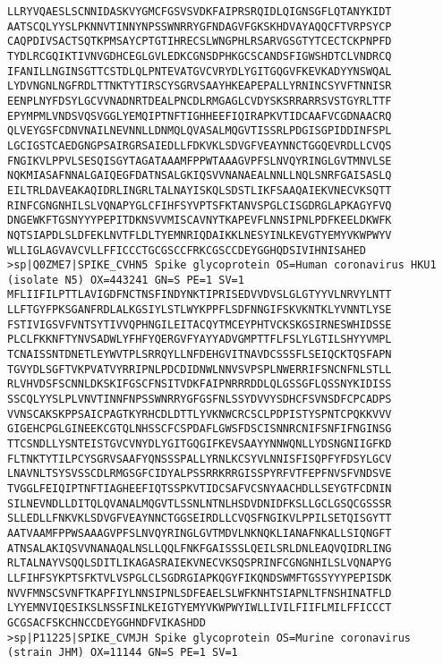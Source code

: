 \documentclass[en,black,12pt,normal]{elegantnote}
\begin{document}
\begin{lstlisting}
LLRYVQAESLSCNNIDASKVYGMCFGSVSVDKFAIPRSRQIDLQIGNSGFLQTANYKIDT
AATSCQLYYSLPKNNVTINNYNPSSWNRRYGFNDAGVFGKSKHDVAYAQQCFTVRPSYCP
CAQPDIVSACTSQTKPMSAYCPTGTIHRECSLWNGPHLRSARVGSGTYTCECTCKPNPFD
TYDLRCGQIKTIVNVGDHCEGLGVLEDKCGNSDPHKGCSCANDSFIGWSHDTCLVNDRCQ
IFANILLNGINSGTTCSTDLQLPNTEVATGVCVRYDLYGITGQGVFKEVKADYYNSWQAL
LYDVNGNLNGFRDLTTNKTYTIRSCYSGRVSAAYHKEAPEPALLYRNINCSYVFTNNISR
EENPLNYFDSYLGCVVNADNRTDEALPNCDLRMGAGLCVDYSKSRRARRSVSTGYRLTTF
EPYMPMLVNDSVQSVGGLYEMQIPTNFTIGHHEEFIQIRAPKVTIDCAAFVCGDNAACRQ
QLVEYGSFCDNVNAILNEVNNLLDNMQLQVASALMQGVTISSRLPDGISGPIDDINFSPL
LGCIGSTCAEDGNGPSAIRGRSAIEDLLFDKVKLSDVGFVEAYNNCTGGQEVRDLLCVQS
FNGIKVLPPVLSESQISGYTAGATAAAMFPPWTAAAGVPFSLNVQYRINGLGVTMNVLSE
NQKMIASAFNNALGAIQEGFDATNSALGKIQSVVNANAEALNNLLNQLSNRFGAISASLQ
EILTRLDAVEAKAQIDRLINGRLTALNAYISKQLSDSTLIKFSAAQAIEKVNECVKSQTT
RINFCGNGNHILSLVQNAPYGLCFIHFSYVPTSFKTANVSPGLCISGDRGLAPKAGYFVQ
DNGEWKFTGSNYYYPEPITDKNSVVMISCAVNYTKAPEVFLNNSIPNLPDFKEELDKWFK
NQTSIAPDLSLDFEKLNVTFLDLTYEMNRIQDAIKKLNESYINLKEVGTYEMYVKWPWYV
WLLIGLAGVAVCVLLFFICCCTGCGSCCFRKCGSCCDEYGGHQDSIVIHNISAHED
>sp|Q0ZME7|SPIKE_CVHN5 Spike glycoprotein OS=Human coronavirus HKU1 (isolate N5) OX=443241 GN=S PE=1 SV=1
MFLIIFILPTTLAVIGDFNCTNSFINDYNKTIPRISEDVVDVSLGLGTYYVLNRVYLNTT
LLFTGYFPKSGANFRDLALKGSIYLSTLWYKPPFLSDFNNGIFSKVKNTKLYVNNTLYSE
FSTIVIGSVFVNTSYTIVVQPHNGILEITACQYTMCEYPHTVCKSKGSIRNESWHIDSSE
PLCLFKKNFTYNVSADWLYFHFYQERGVFYAYYADVGMPTTFLFSLYLGTILSHYYVMPL
TCNAISSNTDNETLEYWVTPLSRRQYLLNFDEHGVITNAVDCSSSFLSEIQCKTQSFAPN
TGVYDLSGFTVKPVATVYRRIPNLPDCDIDNWLNNVSVPSPLNWERRIFSNCNFNLSTLL
RLVHVDSFSCNNLDKSKIFGSCFNSITVDKFAIPNRRRDDLQLGSSGFLQSSNYKIDISS
SSCQLYYSLPLVNVTINNFNPSSWNRRYGFGSFNLSSYDVVYSDHCFSVNSDFCPCADPS
VVNSCAKSKPPSAICPAGTKYRHCDLDTTLYVKNWCRCSCLPDPISTYSPNTCPQKKVVV
GIGEHCPGLGINEEKCGTQLNHSSCFCSPDAFLGWSFDSCISNNRCNIFSNFIFNGINSG
TTCSNDLLYSNTEISTGVCVNYDLYGITGQGIFKEVSAAYYNNWQNLLYDSNGNIIGFKD
FLTNKTYTILPCYSGRVSAAFYQNSSSPALLYRNLKCSYVLNNISFISQPFYFDSYLGCV
LNAVNLTSYSVSSCDLRMGSGFCIDYALPSSRRKRRGISSPYRFVTFEPFNVSFVNDSVE
TVGGLFEIQIPTNFTIAGHEEFIQTSSPKVTIDCSAFVCSNYAACHDLLSEYGTFCDNIN
SILNEVNDLLDITQLQVANALMQGVTLSSNLNTNLHSDVDNIDFKSLLGCLGSQCGSSSR
SLLEDLLFNKVKLSDVGFVEAYNNCTGGSEIRDLLCVQSFNGIKVLPPILSETQISGYTT
AATVAAMFPPWSAAAGVPFSLNVQYRINGLGVTMDVLNKNQKLIANAFNKALLSIQNGFT
ATNSALAKIQSVVNANAQALNSLLQQLFNKFGAISSSLQEILSRLDNLEAQVQIDRLING
RLTALNAYVSQQLSDITLIKAGASRAIEKVNECVKSQSPRINFCGNGNHILSLVQNAPYG
LLFIHFSYKPTSFKTVLVSPGLCLSGDRGIAPKQGYFIKQNDSWMFTGSSYYYPEPISDK
NVVFMNSCSVNFTKAPFIYLNNSIPNLSDFEAELSLWFKNHTSIAPNLTFNSHINATFLD
LYYEMNVIQESIKSLNSSFINLKEIGTYEMYVKWPWYIWLLIVILFIIFLMILFFICCCT
GCGSACFSKCHNCCDEYGGHNDFVIKASHDD
>sp|P11225|SPIKE_CVMJH Spike glycoprotein OS=Murine coronavirus (strain JHM) OX=11144 GN=S PE=1 SV=1

\end{lstlisting}
\end{document}
